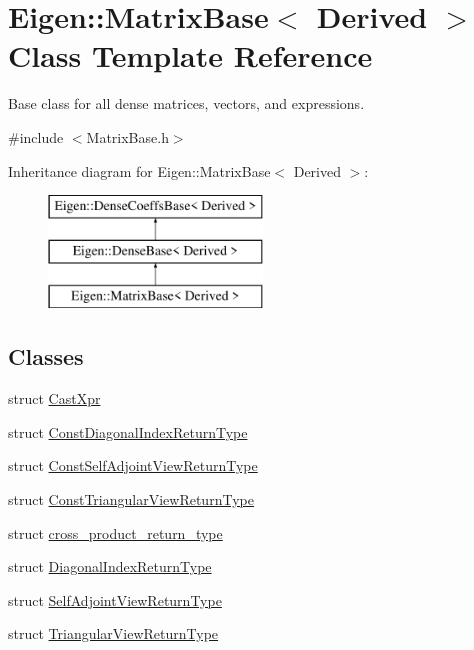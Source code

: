 \hypertarget{class_eigen_1_1_matrix_base}{}\section{Eigen\+::Matrix\+Base$<$ Derived $>$ Class Template Reference}
\label{class_eigen_1_1_matrix_base}


Base class for all dense matrices, vectors, and expressions.  




{\ttfamily \#include $<$Matrix\+Base.\+h$>$}

Inheritance diagram for Eigen\+::Matrix\+Base$<$ Derived $>$\+:\begin{figure}[H]
\begin{center}
\leavevmode
\includegraphics[height=3.000000cm]{class_eigen_1_1_matrix_base}
\end{center}
\end{figure}
\subsection*{Classes}
\begin{DoxyCompactItemize}
\item 
struct \mbox{\hyperlink{struct_eigen_1_1_matrix_base_1_1_cast_xpr}{Cast\+Xpr}}
\item 
struct \mbox{\hyperlink{struct_eigen_1_1_matrix_base_1_1_const_diagonal_index_return_type}{Const\+Diagonal\+Index\+Return\+Type}}
\item 
struct \mbox{\hyperlink{struct_eigen_1_1_matrix_base_1_1_const_self_adjoint_view_return_type}{Const\+Self\+Adjoint\+View\+Return\+Type}}
\item 
struct \mbox{\hyperlink{struct_eigen_1_1_matrix_base_1_1_const_triangular_view_return_type}{Const\+Triangular\+View\+Return\+Type}}
\item 
struct \mbox{\hyperlink{struct_eigen_1_1_matrix_base_1_1cross__product__return__type}{cross\+\_\+product\+\_\+return\+\_\+type}}
\item 
struct \mbox{\hyperlink{struct_eigen_1_1_matrix_base_1_1_diagonal_index_return_type}{Diagonal\+Index\+Return\+Type}}
\item 
struct \mbox{\hyperlink{struct_eigen_1_1_matrix_base_1_1_self_adjoint_view_return_type}{Self\+Adjoint\+View\+Return\+Type}}
\item 
struct \mbox{\hyperlink{struct_eigen_1_1_matrix_base_1_1_triangular_view_return_type}{Triangular\+View\+Return\+Type}}
\end{DoxyCompactItemize}
